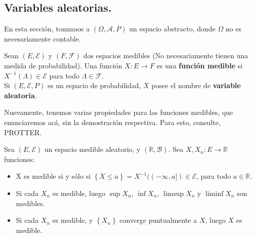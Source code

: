 





















\subsection{Variables aleatorias.}

En esta sección, tommaos a $(\Omega, \mathcal{A}, P)$ un espacio abstracto, donde $\Omega$ no es necesariamente contable.

\begin{boxDef}
	Sean $(E, \mathcal{E})$ y $(F, \mathcal{F})$ dos espacios medibles (No necesariamente tienen una medida de probabilidad). Una función $X: E \rightarrow F$ es una \textbf{función medible} si $X^{-1}(\Lambda) \in \mathcal{E}$ para todo $\Lambda \in \mathcal{F}$.\\

	Si $(E, \mathcal{E}, P)$ es un espacio de probabilidad, $X$ posee el nombre de \textbf{variable aleatoria}.
\end{boxDef}

Nuevamente, tenemos varias propiedades para las funciones medibles, que enunciaremos acá, sin la demostración respectiva. Para esto, consulte, PROTTER.

\begin{coro}
	Sea $(E, \mathcal{E})$ un espacio medible aleatorio, y $(\mathbb{R}, \mathcal{B})$. Sea $X, X_n: E \rightarrow \mathbb{R}$ funciones:

	\begin{itemize}
		\item X es medible si y sólo si $\left\{ X \leq a \right\} = X^{-1}( (-\infty, a] ) \in \mathcal{E}$, para todo $a \in \mathbb{R}$.
		\item Si cada $X_n$ es medible, luego $\sup X_n$, $\inf X_n$, $\limsup X_n$ y $\liminf X_n$ son medibles.
		\item Si cada $X_n$ es medible, y $\left\{X_n\right\}$ converge puntualmente a $X$, luego $X$ es medible. 
	\end{itemize}

\end{coro}

